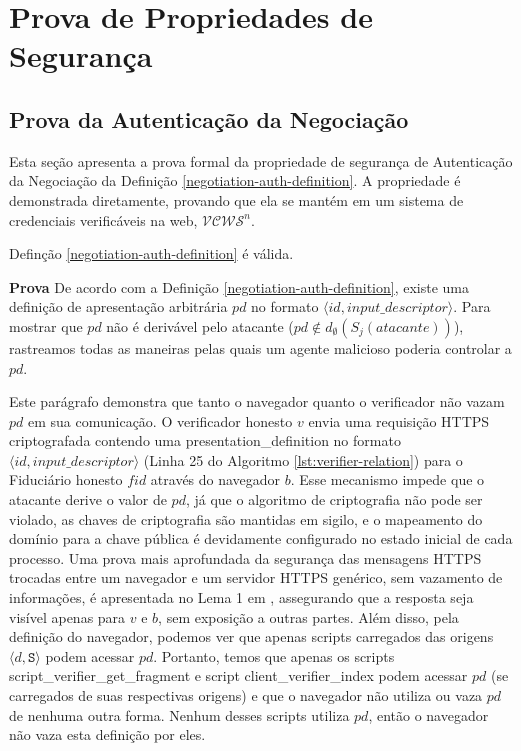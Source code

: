 \section{Prova de Propriedades de Segurança}

\subsection*{Prova da Autenticação da Negociação}
Esta seção apresenta a prova formal da propriedade de segurança de Autenticação da Negociação da Definição \ref{negotiation-auth-definition}. A propriedade é demonstrada diretamente, provando que ela se mantém em um sistema de credenciais verificáveis na web, $\mathcal{VCWS}^n$.

\begin{lema}
Definção \ref{negotiation-auth-definition} é válida.
\end{lema}

\textbf{Prova} De acordo com a Definição \ref{negotiation-auth-definition}, existe uma definição de apresentação arbitrária $pd$ no formato $\langle id, input\_descriptor \rangle$. Para mostrar que $pd$ não é derivável pelo atacante ($pd \not \in d_{\emptyset}(S_j(atacante))$), rastreamos todas as maneiras pelas quais um agente malicioso poderia controlar a $pd$.

  Este parágrafo demonstra que tanto o navegador quanto o verificador não vazam $pd$ em sua comunicação. O verificador honesto $v$ envia uma requisição HTTPS criptografada contendo
  uma presentation\_definition no formato $ \langle id, input\_descriptor\rangle $ (Linha 25 do Algoritmo \ref{lst:verifier-relation}) para o Fiduciário honesto $fid$ através do navegador $b$. 
  Esse mecanismo impede que o atacante derive o valor de $pd$, já que o algoritmo de criptografia não pode ser violado, as chaves de criptografia são mantidas em sigilo, e o mapeamento do domínio para a chave pública é devidamente configurado no estado inicial de cada processo. 
  Uma prova mais aprofundada da segurança das mensagens HTTPS trocadas entre um navegador e um servidor HTTPS genérico, sem vazamento de informações, é apresentada no Lema 1 em \cite{fett2024wim}, assegurando que a resposta seja visível apenas para $v$ e $b$, sem exposição a outras partes.
  Além disso, pela definição do navegador, podemos ver que apenas scripts carregados das origens $\langle d, \texttt{S} \rangle$ podem acessar $pd$. 
  Portanto, temos que apenas os scripts script\_verifier\_get\_fragment e script client\_verifier\_index podem acessar $pd$ (se carregados de suas respectivas origens) e que o navegador não utiliza ou vaza $pd$ de nenhuma outra forma.
  Nenhum desses scripts utiliza $pd$, então o navegador não vaza esta definição por eles.
  
